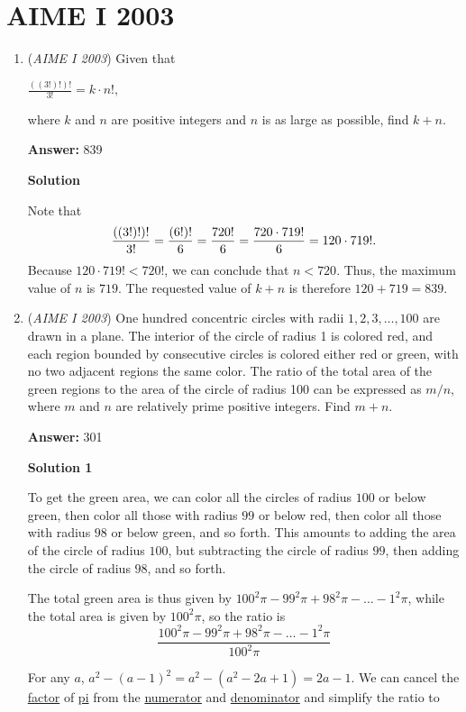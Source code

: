 \section{AIME I 2003}
        \begin{enumerate}
        	\item (\textit{AIME I 2003}) Given that


 $\frac{((3!)!)!}{3!} = k \cdot n!,$

 where $k$ and $n$ are positive integers and $n$ is as large as possible, find $k + n.$

 \textbf{Answer: }839



\textbf{Solution}

Note that
 \[{{\left((3!)!\right)!}\over{3!}}= {{(6!)!}\over{6}}={{720!}\over6}={{720\cdot719!}\over6}=120\cdot719!.\]Because $120\cdot719!<720!$, we can conclude that $n < 720$. Thus, the maximum value of $n$ is $719$. The requested value of $k+n$ is therefore $120+719=\boxed{839}$.

 


	\item (\textit{AIME I 2003}) One hundred concentric circles with radii $1, 2, 3, \dots, 100$ are drawn in a plane. The interior of the circle of radius 1 is colored red, and each region bounded by consecutive circles is colored either red or green, with no two adjacent regions the same color. The ratio of the total area of the green regions to the area of the circle of radius 100 can be expressed as $m/n,$ where $m$ and $n$ are relatively prime positive integers. Find $m + n.$

 \textbf{Answer: }301



\textbf{Solution 1}

To get the green area, we can color all the circles of radius $100$ or below green, then color all those with radius $99$ or below red, then color all those with radius $98$ or below green, and so forth.  This amounts to adding the area of the circle of radius $100$, but subtracting the circle of radius $99$, then adding the circle of radius $98$, and so forth.

 The total green area is thus given by $100^{2} \pi - 99^{2} \pi + 98^{2} \pi - \ldots - 1^{2} \pi$, while the total area is given by $100^{2} \pi$, so the ratio is
 \[\frac{100^{2}\pi - 99^{2}\pi + 98^{2}\pi - \ldots - 1^{2}\pi}{100^{2}\pi}\]

 For any $a$, $a^{2}-(a-1)^{2}=a^{2}-(a^{2}-2a+1)=2a-1$.  We can cancel the \href{https://artofproblemsolving.com/wiki/index.php?title=Divisor}{ factor} of \href{https://artofproblemsolving.com/wiki/index.php?title=Pi}{pi} from the \href{https://artofproblemsolving.com/wiki/index.php?title=Numerator}{numerator} and \href{https://artofproblemsolving.com/wiki/index.php?title=Denominator}{denominator} and simplify the ratio to 


\end{enumerate}
